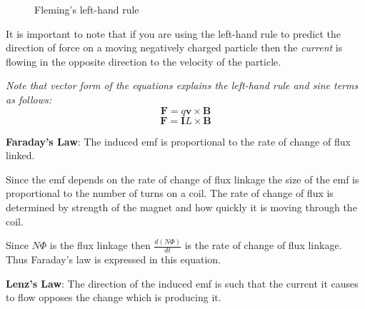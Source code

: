 \documentclass[main.tex]{subfiles}
\begin{document}
\begin{figure}[ht]
  \begin{center}
  \end{center}
  \caption{Fleming's left-hand rule}
  \label{flemminglh}
\end{figure}

It is important to note that if you are using the left-hand rule to predict the direction of force on a moving negatively charged particle then the \emph{current} is flowing in the opposite direction to the velocity of the particle.

\emph{Note that vector form of the equations explains the left-hand rule and sine terms as follows:}
$$\mathbf{F} = q\mathbf{v}\times\mathbf{B}$$
$$\mathbf{F} = \mathbf{I}L\times\mathbf{B}$$
\newpage
{}

\begin{framed}
\textbf{Faraday's Law}: The induced emf is proportional to the rate of change of flux linked.
\end{framed}

Since the emf depends on the rate of change of flux linkage the size of the emf is proportional to the number of turns on a coil. The rate of change of flux is determined by strength of the magnet and how quickly it is moving through the coil.


Since $N\Phi$ is the flux linkage then $\frac{d(N\Phi)}{dt}$ is the rate of change of flux linkage. Thus Faraday's law is expressed in this equation.

\begin{framed}
\textbf{Lenz's Law}: The direction of the induced emf is such that the current it causes to flow opposes the change which is producing it.
\end{framed}
\end{document}
